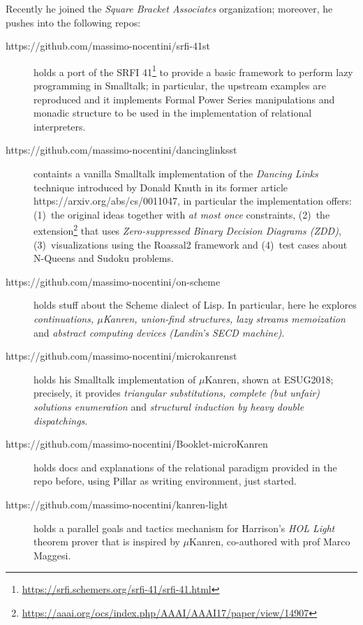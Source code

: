 \documentclass[a4paper]{article} %
\begin{document}
    Recently he joined the \textit{Square Bracket Associates} organization; moreover,
    he pushes into the following repos:
    \begin{description}
		
		\item[https://github.com/massimo-nocentini/srfi-41st] holds a port
		of the SRFI 41\footnote{\url{https://srfi.schemers.org/srfi-41/srfi-41.html}} to
		provide a basic framework to perform lazy programming in Smalltalk; in particular,
		the upstream examples are reproduced and it implements Formal Power Series manipulations
		and monadic structure to be used in the implementation of relational interpreters.
		
        \item[https://github.com/massimo-nocentini/dancinglinksst] containts
		a vanilla Smalltalk implementation of the \emph{Dancing Links} technique introduced 
		by Donald Knuth in its former article https://arxiv.org/abs/cs/0011047, in particular
		the implementation offers: (1)~the original ideas together with \emph{at most once} 
		constraints, (2)~the extension\footnote{\url{https://aaai.org/ocs/index.php/AAAI/AAAI17/paper/view/14907}} that uses \emph{Zero-suppressed Binary Decision Diagrams (ZDD)}, (3)~visualizations 
		using the Roassal2 framework and (4)~test cases about N-Queens and Sudoku problems.
		
		\item[https://github.com/massimo-nocentini/on-scheme] holds stuff about
        the Scheme dialect of Lisp. In particular, here he explores
        \textit{continuations, $\mu$Kanren, union-find structures, lazy streams
        memoization} and \textit{abstract computing devices (Landin's SECD machine)}.

        \item[https://github.com/massimo-nocentini/microkanrenst] holds his
        Smalltalk implementation of $\mu$Kanren, shown at ESUG2018; precisely,
        it provides \textit{triangular substitutions, complete (but unfair)
        solutions enumeration} and \textit{structural induction by heavy double
        dispatchings}.

        \item[https://github.com/massimo-nocentini/Booklet-microKanren] holds
        docs and explanations of the relational paradigm provided in the repo before,
        using Pillar as writing environment, just started.

        \item[https://github.com/massimo-nocentini/kanren-light] holds a
        parallel goals and tactics mechanism for Harrison's \textit{HOL Light}
        theorem prover that is inspired by $\mu$Kanren, co-authored with prof
        Marco Maggesi.


\end{description}
\end{document}
